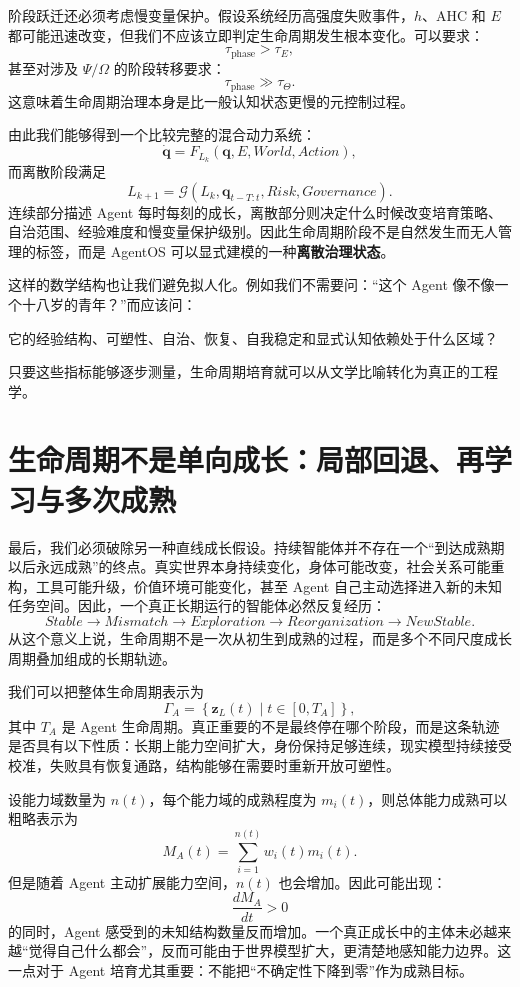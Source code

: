 阶段跃迁还必须考虑慢变量保护。假设系统经历高强度失败事件，$h$、AHC 和 $E$ 都可能迅速改变，但我们不应该立即判定生命周期发生根本变化。可以要求：
\[
\tau_{\mathrm{phase}}
>
\tau_E,
\]
甚至对涉及 $\Psi/\Omega$ 的阶段转移要求：
\[
\tau_{\mathrm{phase}}
\gg
\tau_\Theta.
\]
这意味着生命周期治理本身是比一般认知状态更慢的元控制过程。

由此我们能够得到一个比较完整的混合动力系统：
\[
\dot{\mathbf q}
=
F_{L_k}
\left(
\mathbf q,
E,
World,
Action
\right),
\]
而离散阶段满足
\[
L_{k+1}
=
\mathcal G
\left(
L_k,
\mathbf q_{t-T:t},
Risk,
Governance
\right).
\]
连续部分描述 Agent 每时每刻的成长，离散部分则决定什么时候改变培育策略、自治范围、经验难度和慢变量保护级别。因此生命周期阶段不是自然发生而无人管理的标签，而是 AgentOS 可以显式建模的一种\textbf{离散治理状态}。

这样的数学结构也让我们避免拟人化。例如我们不需要问：“这个 Agent 像不像一个十八岁的青年？”而应该问：
\begin{statementbox}
它的经验结构、可塑性、自治、恢复、自我稳定和显式认知依赖处于什么区域？
\end{statementbox}
只要这些指标能够逐步测量，生命周期培育就可以从文学比喻转化为真正的工程学。

\section{生命周期不是单向成长：局部回退、再学习与多次成熟}

最后，我们必须破除另一种直线成长假设。持续智能体并不存在一个“到达成熟期以后永远成熟”的终点。真实世界本身持续变化，身体可能改变，社会关系可能重构，工具可能升级，价值环境可能变化，甚至 Agent 自己主动选择进入新的未知任务空间。因此，一个真正长期运行的智能体必然反复经历：
\[
Stable
\rightarrow
Mismatch
\rightarrow
Exploration
\rightarrow
Reorganization
\rightarrow
NewStable.
\]
从这个意义上说，生命周期不是一次从初生到成熟的过程，而是多个不同尺度成长周期叠加组成的长期轨迹。

我们可以把整体生命周期表示为
\[
\Gamma_A
=
\left\{
\mathbf z_L(t)
\mid
t\in[0,T_A]
\right\},
\]
其中 $T_A$ 是 Agent 生命周期。真正重要的不是最终停在哪个阶段，而是这条轨迹是否具有以下性质：长期上能力空间扩大，身份保持足够连续，现实模型持续接受校准，失败具有恢复通路，结构能够在需要时重新开放可塑性。

设能力域数量为 $n(t)$，每个能力域的成熟程度为 $m_i(t)$，则总体能力成熟可以粗略表示为
\[
M_A(t)
=
\sum_{i=1}^{n(t)}
w_i(t)m_i(t).
\]
但是随着 Agent 主动扩展能力空间，$n(t)$ 也会增加。因此可能出现：
\[
\frac{dM_A}{dt}>0
\]
的同时，Agent 感受到的未知结构数量反而增加。一个真正成长中的主体未必越来越“觉得自己什么都会”，反而可能由于世界模型扩大，更清楚地感知能力边界。这一点对于 Agent 培育尤其重要：不能把“不确定性下降到零”作为成熟目标。

